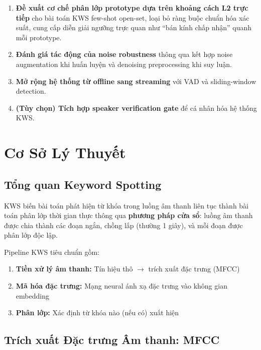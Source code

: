 \documentclass[12pt,a4paper]{report}
\begin{document}
\begin{enumerate}
    \item \textbf{Đề xuất cơ chế phân lớp prototype dựa trên khoảng cách L2
          trực tiếp} cho bài toán KWS few-shot open-set, loại bỏ ràng buộc
          chuẩn hóa xác suất, cung cấp diễn giải ngưỡng trực quan như ``bán
          kính chấp nhận'' quanh mỗi prototype.
    \item \textbf{Đánh giá tác động của noise robustness} thông qua kết hợp
          noise augmentation khi huấn luyện và denoising preprocessing khi
          suy luận.
    \item \textbf{Mở rộng hệ thống từ offline sang streaming} với VAD và
          sliding-window detection.
    \item \textbf{(Tùy chọn) Tích hợp speaker verification gate} để cá nhân
          hóa hệ thống KWS.
\end{enumerate}

\chapter{Cơ Sở Lý Thuyết}

\section{Tổng quan Keyword Spotting}

KWS biến bài toán phát hiện từ khóa trong luồng âm thanh liên tục thành bài
toán phân lớp thời gian thực thông qua \textbf{phương pháp cửa sổ}: luồng âm
thanh được chia thành các đoạn ngắn, chồng lấp (thường 1 giây), và mỗi đoạn
được phân lớp độc lập.

Pipeline KWS tiêu chuẩn gồm:
\begin{enumerate}
    \item \textbf{Tiền xử lý âm thanh:} Tín hiệu thô $\rightarrow$ trích
          xuất đặc trưng (MFCC)
    \item \textbf{Mã hóa đặc trưng:} Mạng neural ánh xạ đặc trưng vào không
          gian embedding
    \item \textbf{Phân lớp:} Xác định từ khóa nào (nếu có) xuất hiện
\end{enumerate}

\section{Trích xuất Đặc trưng Âm thanh: MFCC}
\label{sec:mfcc_vi}
\end{document}
